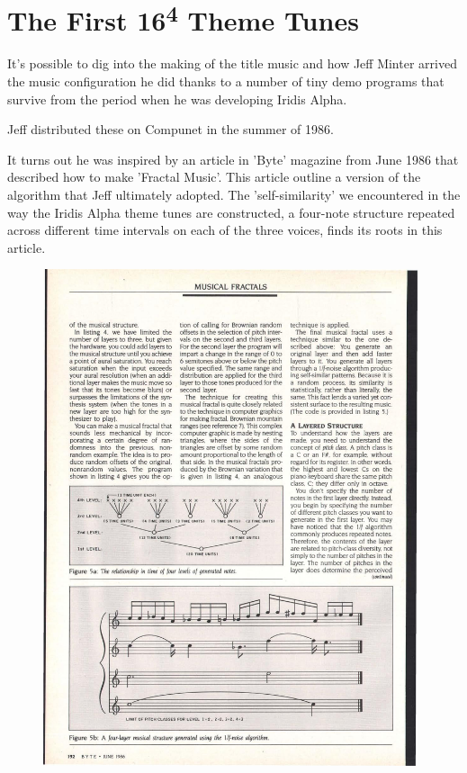 \chapter{The First 16\textsuperscript{4} Theme Tunes} 

It's possible to dig into the making of the title music and how Jeff Minter
arrived the music configuration he did thanks to a number of tiny demo programs that
survive from the period when he was developing Iridis Alpha.

Jeff distributed these on Compunet in the summer of 1986.

It turns out he was inspired by an article in 'Byte' magazine from June 1986 that
described how to make 'Fractal Music'. This article outline a version of the
algorithm that Jeff ultimately adopted. The 'self-similarity' we encountered
in the way the Iridis Alpha theme tunes are constructed, a four-note structure
repeated across different time intervals on each of the three voices, finds its
roots in this article.


\begin{figure}[H]
{
  \begin{adjustbox}{width=11cm,center}
  \includegraphics[width=11cm]{torus/fractal.jpg}%
    \end{adjustbox}
}\caption[]{}
\end{figure}


